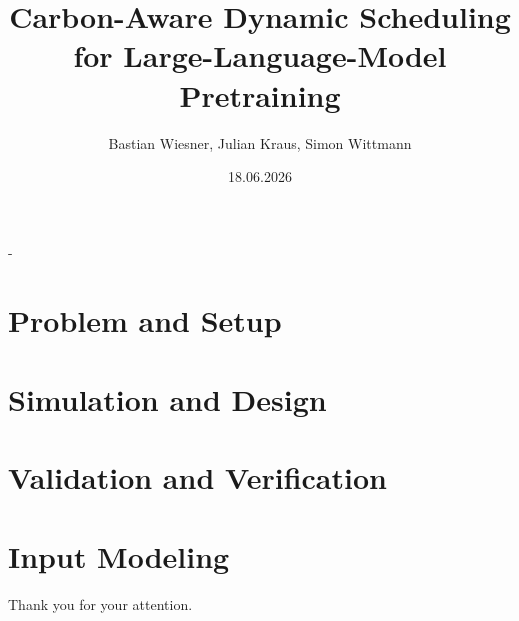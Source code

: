\documentclass[final]{beamer}
\title[Emission-Aware LLM Training]{Carbon-Aware Dynamic Scheduling for Large-Language-Model Pretraining}
\author[TheGreenEpoch]{
  Bastian Wiesner, Julian Kraus, Simon Wittmann%
}
\institute[FAU]{%
  Friedrich-Alexander-Universität Erlangen-Nürnberg, Computer Science 7%
}
\date{18.06.2026}
\begin{document}
\begin{frame}[t,titleimagenofooter]{-}
  \titlepage%
\end{frame}

%

\section{Problem and Setup}








% 

\section{Simulation and Design}




\section{Validation and Verification}


\section{Input Modeling}

%


\begin{frame}[titleimagenofooter]{}{}
  \centering
  Thank you for your attention.
\end{frame}


\end{document}
